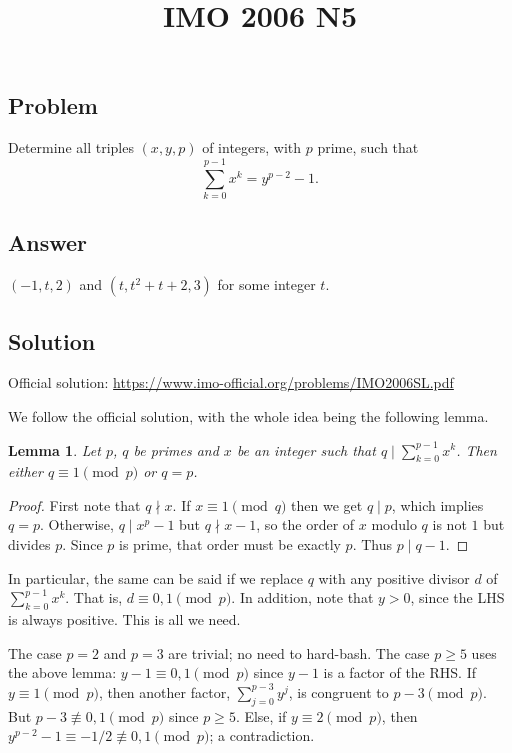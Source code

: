 \documentclass{article}
\title{IMO 2006 N5}
\author{}
\date{}
\newtheorem{lemma}{Lemma}
\begin{document}
\maketitle



\subsection*{Problem}

Determine all triples $(x, y, p)$ of integers, with $p$ prime, such that
\[ \sum_{k = 0}^{p - 1} x^k = y^{p - 2} - 1. \tag{*}\label{2006n5-eq0} \]



\subsection*{Answer}

$(-1, t, 2)$ and $(t, t^2 + t + 2, 3)$ for some integer $t$.



\subsection*{Solution}

Official solution: \url{https://www.imo-official.org/problems/IMO2006SL.pdf}

We follow the official solution, with the whole idea being the following lemma.

\begin{lemma}\label{2006n5-1}
Let $p$, $q$ be primes and $x$ be an integer such that $q \mid \sum_{k = 0}^{p - 1} x^k$.
Then either $q \equiv 1 \pmod{p}$ or $q = p$.
\end{lemma}
\begin{proof}
First note that $q \nmid x$.
If $x \equiv 1 \pmod{q}$ then we get $q \mid p$, which implies $q = p$.
Otherwise, $q \mid x^p - 1$ but $q \nmid x - 1$, so the order of $x$ modulo $q$ is not $1$ but divides $p$.
Since $p$ is prime, that order must be exactly $p$.
Thus $p \mid q - 1$.
\end{proof}

In particular, the same can be said if we replace $q$ with any positive divisor $d$ of $\sum_{k = 0}^{p - 1} x^k$.
That is, $d \equiv 0, 1 \pmod{p}$.
In addition, note that $y > 0$, since the LHS is always positive.
This is all we need.

The case $p = 2$ and $p = 3$ are trivial; no need to hard-bash.
The case $p \geq 5$ uses the above lemma: $y - 1 \equiv 0, 1 \pmod{p}$ since $y - 1$ is a factor of the RHS.
If $y \equiv 1 \pmod{p}$, then another factor, $\sum_{j = 0}^{p - 3} y^j$, is congruent to $p - 3 \pmod{p}$.
But $p - 3 \not\equiv 0, 1 \pmod{p}$ since $p \geq 5$.
Else, if $y \equiv 2 \pmod{p}$, then $y^{p - 2} - 1 \equiv -1/2 \not\equiv 0, 1 \pmod{p}$; a contradiction.
\end{document}
